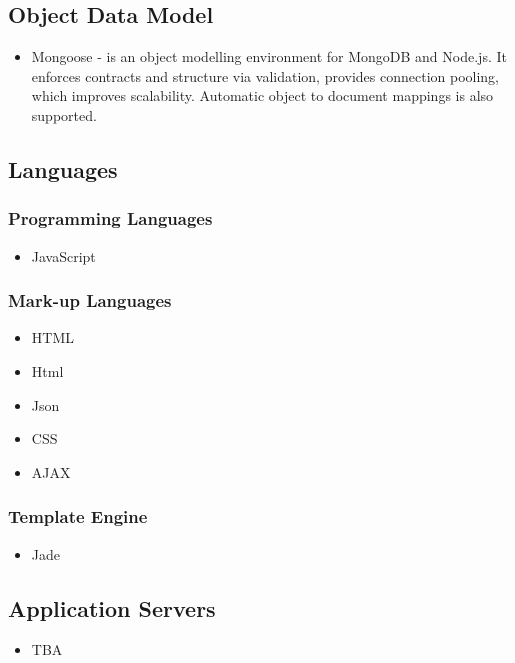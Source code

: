 \subsection{Object Data Model}
\begin{itemize}
	\item Mongoose - is an object modelling environment for MongoDB and Node.js. It enforces contracts and structure via validation, provides connection pooling, which improves scalability. Automatic object to document mappings is also supported.
\end{itemize}

\subsection{Languages}
\subsubsection{Programming Languages}
\begin{itemize}
	\item JavaScript	
\end{itemize}

\subsubsection{Mark-up Languages}
\begin{itemize}
	\item HTML
	\item Html
	\item Json
	\item CSS
	\item AJAX
\end{itemize}

\subsubsection{Template Engine}
\begin{itemize}
	\item Jade
\end{itemize}


\subsection{Application Servers}
\begin{itemize}
	\item TBA
\end{itemize}


